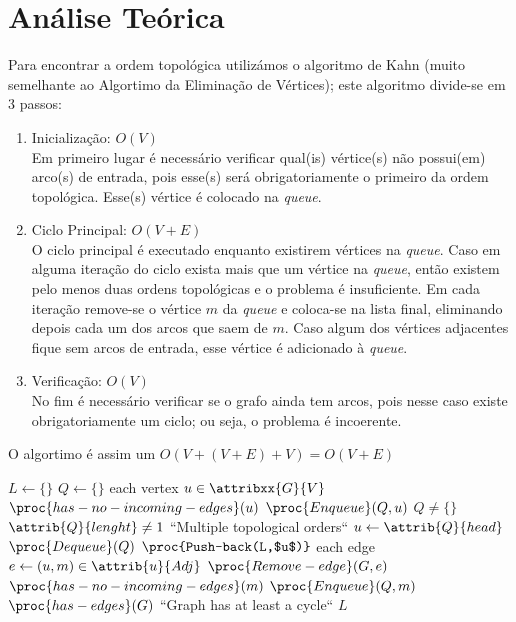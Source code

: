 \documentclass[a4paper]{article}
\begin{document}
  \section{Análise Teórica}
  Para encontrar a ordem topológica utilizámos o algoritmo de Kahn (muito semelhante
  ao Algortimo da Eliminação de Vértices); este algoritmo divide-se em 3 passos:
  \begin{enumerate}
    \item Inicialização: \(O(V)\)\\
      Em primeiro lugar é necessário verificar qual(is) vértice(s) não possui(em) arco(s)
      de entrada, pois esse(s) será obrigatoriamente o primeiro da ordem topológica.
      Esse(s) vértice é colocado na \textit{queue}.
    \item Ciclo Principal: \(O(V+E)\)\\
      O ciclo principal é executado enquanto existirem vértices na \textit{queue}.
      Caso em alguma iteração do ciclo exista mais que um vértice na \textit{queue}, então existem pelo menos
      duas ordens topológicas e o problema é insuficiente.
      Em cada iteração remove-se o vértice \(m\) da \textit{queue} e coloca-se na lista final, eliminando depois cada um dos arcos
      que saem de \(m\). Caso algum dos vértices adjacentes fique sem arcos de entrada, esse vértice é adicionado à \textit{queue}.
    \item Verificação: \(O(V)\)\\
      No fim é necessário verificar se o grafo ainda tem arcos, pois nesse caso existe obrigatoriamente um ciclo; ou seja,
      o problema é incoerente.
  \end{enumerate}

  O algortimo é assim um \(O(V + (V + E) + V) = O(V + E)\)

  \begin{codebox}
    \li $L \gets \{\}$
    \li $Q \gets \{\}$
    \li \For each vertex $u \in \attribxx{G}{V}$
    \li \Do
          \If $\proc{has-no-incoming-edges}(u)$
    \li   \Then
            $\proc{Enqueue}(Q,u)$
          \End
        \End
    \zi
    \li \While $Q \ne \{\}$
    \li \Do
          \If $\attrib{Q}{lenght} \ne 1$
    \li   \Then
            \Error ``Multiple topological orders``
          \End
    \li   $u \gets \attrib{Q}{head}$
    \li   $\proc{Dequeue}(Q)$
    \li   $\proc{Push-back(L,$u$)}$
    \li   \For each edge $e \gets (u,m) \in \attrib{u}{Adj}$
    \li   \Do
            $\proc{Remove-edge}(G,e)$
    \li     \If $\proc{has-no-incoming-edges}(m)$
    \li     \Then
              $\proc{Enqueue}(Q,m)$
            \End
          \End
        \End
    \li \If $\proc{has-edges}(G)$
    \li \Then
          \Error ``Graph has at least a cycle``
        \End
    \li \Return $L$
  \end{codebox}
\end{document}
